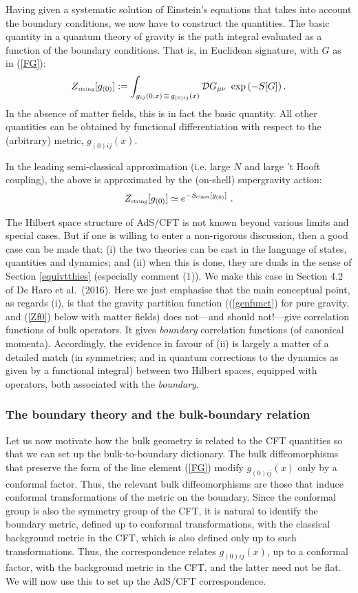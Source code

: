 \documentclass[12pt]{article}
\def\m{\mu}
\def\n{\nu}
\renewcommand{\^}[1]{\hat{#1}}
\newcommand{\tn}[1]{\mbox{\tiny #1}}
\newcommand{\bea}{\begin{eqnarray}}
\newcommand{\eea}{\end{eqnarray}}
\newcommand{\eq}[1]{(\ref{#1})}
\begin{document}
Having given a systematic solution of Einstein's equations that takes into account the boundary conditions, we now have to construct the quantities. The basic quantity in a quantum theory of gravity is the path integral evaluated as a function of the boundary conditions. That is, in Euclidean signature, with $G$ as in \eq{FG}:
\bea\label{genfunct}
Z_{\tn{string}}[g_{(0)}]:=\int_{g_{ij}(0,x)\,\equiv\,g_{(0)ij}(x)}{\cal D}G_{\m\n}~\exp\left(-S[G]\right).
\eea
In the absence of matter fields, this is in fact the basic quantity. All other quantities can be obtained by functional differentiation with respect to the (arbitrary) metric, $g_{(0)ij}(x)$.

In the leading semi-classical approximation (i.e. large $N$ and large 't Hooft coupling), the above is approximated by the (on-shell) supergravity action:
\bea\label{class}
Z_{\tn{string}}[g_{(0)}]\simeq e^{-S_{\tn{class}}[g_{(0)}]}~.
\eea

The Hilbert space structure of AdS/CFT is not known beyond various limits and special cases. But if one is willing to enter a non-rigorous discussion, then a good case can be made that: (i) the  two theories can be cast in the language of states, quantities and dynamics; and (ii) when this is done, they are duals in the sense of Section \ref{equivtthies} (especially comment (1)). We make this case in Section 4.2 of De Haro et al.~(2016). Here we just emphasise that the main conceptual point, as regards (i), is that the gravity partition function (\eq{genfunct} for pure gravity, and  \eq{Zf0} below with matter fields) does not---and should not!---give correlation functions of bulk operators. It gives {\em boundary} correlation functions (of canonical momenta). Accordingly, the evidence in favour of (ii) is largely a matter of  a detailed match (in symmetries; and in quantum corrections to the dynamics as given by a functional integral) between two Hilbert spaces, equipped with operators, both associated with the {\em boundary}.

\subsubsection{The boundary theory and the bulk-boundary relation}\label{bulkbdy}  

Let us now motivate how the bulk geometry is related to the CFT quantities so that we can set up the bulk-to-boundary dictionary. The bulk diffeomorphisms that preserve the form of the line element \eq{FG} modify $g_{(0)ij}(x)$ only by a conformal factor. Thus, the relevant bulk diffeomorphisms are those that induce conformal transformations of the metric on the boundary. 
Since the conformal group  is also the symmetry group of the CFT, it is natural to identify the boundary metric, defined up to conformal transformations, with the classical background metric in the CFT, which is also defined only up to such  transformations. Thus, the correspondence relates $g_{(0)ij}(x)$, up to a conformal factor, with the background metric in the CFT, and the latter need not be flat. We will now use this to set up the AdS/CFT correspondence.
\end{document}
